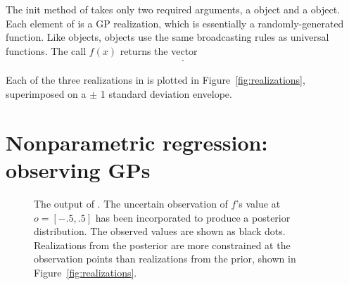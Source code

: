 \documentclass[article]{jss}
\begin{document}
The init method of  takes only two required arguments, a  object and a  object. Each element of  is a GP realization, which is essentially a randomly-generated  function. Like  objects,  objects use the same broadcasting rules as  universal functions. The call $f(x)$ returns the vector
\begin{eqnarray*}
    [f(x_0)\ldots f(x_{N_x-1})].
\end{eqnarray*}

Each of the three realizations in  is plotted in Figure~\ref{fig:realizations}, superimposed on a $\pm$ 1 standard deviation envelope.


\section{Nonparametric regression: observing GPs}\label{sec:observing}

\begin{figure}
    \centering
    \caption{The output of . The uncertain observation of $f$'s value at $o=[-.5,.5]$ has been incorporated to produce a posterior distribution. The observed values are shown as black dots. Realizations from the posterior are more constrained at the observation points than realizations from the prior, shown in Figure~\ref{fig:realizations}.}
    \label{fig:obs}
\end{figure}
\end{document}
